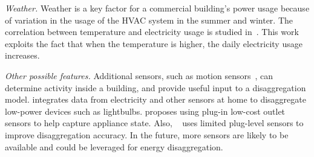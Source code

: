 %

\textit{Weather.}
Weather is a key factor for a commercial building's power usage
because of variation in the usage of the HVAC system in the summer and winter.
The correlation between temperature and electricity usage 
is studied in~\cite{pardo2002temperature}. 
This work exploits the fact that
when the temperature is higher, 
the daily electricity usage increases. 

\textit{Other possible features.}
Additional sensors, such as motion sensors~\cite{cook2011sensor}, 
can determine activity inside a building, and provide useful input to a
disaggregation model.
\cite{srinivasan2013fixturefinder} integrates data from electricity 
and other sensors at home to disaggregate  low-power 
devices such as lightbulbs. \cite{wu2012low} proposes using plug-in low-cost outlet sensors to help capture 
appliance state. 
Also, ~\cite{uttama2013sustainable} uses limited plug-level sensors to improve 
disaggregation accuracy. 
In the future, more sensors are likely to be available and could be leveraged for 
energy disaggregation.





